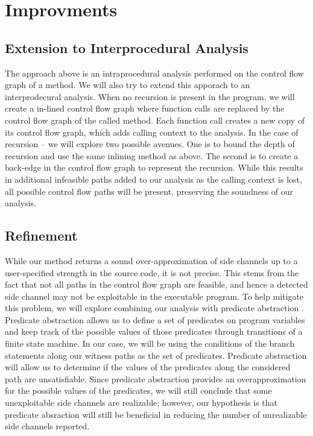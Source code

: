 \section{Improvments}
\subsection{Extension to Interprocedural Analysis}
The approach above is an intraprocedural analysis performed on the control flow graph of a method. We will also try to extend this apporach to an interprodecural analysis. When no recursion is present in the program, we will create a in-lined control flow graph where function calls are replaced by the control flow graph of the called method. Each function call creates a new copy of its control flow graph, which adds calling context to the analysis. In the case of recursion -- we will explore two possible avenues. One is to bound the depth of recursion and use the same inlining method as above. The second is to create a back-edge in the control flow graph to represent the recursion. While this results in additional infeasible paths added to our analysis as the calling context is lost, all possible control flow paths will be present, preserving the soundness of our analysis. 

\subsection{Refinement}

While our method returns a sound over-approximation of side channels up to a user-specified strength in the source code, it is not precise. This stems from the fact that not all paths in the control flow graph are feasible, and hence a detected side channel may not be exploitable in the executable program. To help mitigate this problem, we will explore combining our analysis with predicate abstraction \cite{predicate}. Predicate abstraction allows us to define a set of predicates on program variables and keep track of the possible values of those predicates through transitions of a finite state machine. In our case, we will be using the conditions of the branch statements along our witness paths as the set of predicates. Predicate abstraction will allow us to determine if the values of the predicates along the considered path are unsatisfiable. Since predicate abstraction provides an overapproximation for the possible values of the predicates, we will still conclude that some unexploitable side channels are realizable; however, our hypothesis is that predicate absraction will still be beneficial in reducing the number of unrealizable side channels reported. 

